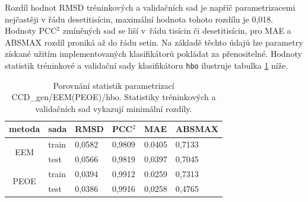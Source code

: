 Rozdíl hodnot RMSD tréninkových a validačních sad je napříč parametrizacemi nejčastěji v řádu desetitisícin, maximální hodnota tohoto rozdílu je 0,018. Hodnoty PCC$^2$ zmíněných sad se liší v~řádu tisícin či desetitisícin, pro MAE a ABSMAX rozdíl proniká až do řádu setin. Na základě těchto údajů lze  parametry získané užitím implementovaných klasifikátorů pokládat za přenositelné. Hodnoty statistik tréninkové a validační sady klasifikátoru \verb|hbo| ilustruje tabulka \ref{prenositelnost} níže.

\begin{table}[h]
    \renewcommand{\arraystretch}{1.4}
    \centering
    \begin{tabular}{c|l|l|l|l|l}
         \textbf{metoda} & \textbf{sada} & \textbf{RMSD} & \textbf{PCC$^2$} & \textbf{MAE} & \textbf{ABSMAX}\\
         \hline
         \multirow{2}{4em}{EEM} & train & 0,0582 & 0,9809 & 0.0405 & 0,7133  \\
         & test & 0,0566 & 0,9819 & 0,0397 & 0,7045 \\
         \hline
         \multirow{2}{4em}{PEOE} & train & 0,0394 & 0,9912 & 0.0259 & 0,7313  \\
         & test & 0,0386  & 0,9916 & 0,0258 & 0,4765 \\
    \end{tabular}
    \caption{Porovnání statistik parametrizací CCD\_gen/EEM(PEOE)/hbo. Statistiky tréninkových a validačních sad vykazují minimální rozdíly.}
    \label{prenositelnost}
\end{table}

